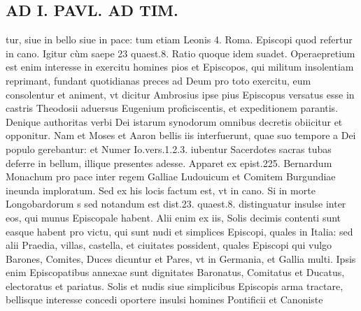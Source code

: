 \documentclass{article}
\begin{document}
\begin{pages}
\section*{AD I. PAVL. AD TIM. }
\marginpar{[ p.139 ]}\pstart tur, siue in bello siue in pace: tum etiam Leonis 4. Roma. Episcopi quod refertur in cano. Igitur cùm saepe 23 quaest.8. Ratio quoque idem suadet. Operaepretium est enim interesse in exercitu homines pios et Episcopos, qui militum insolentiam reprimant, fundant quotidianas preces ad Deum pro toto exercitu, eum consolentur et animent, vt dicitur Ambrosius ipse pius Episcopus versatus esse in castris Theodosii aduersus Eugenium proficiscentis, et expeditionem parantis. Denique authoritas verbi Dei istarum synodorum omnibus decretis obiicitur et opponitur. Nam et Moses et Aaron bellis iis interfuerunt, quae suo tempore a Dei populo gerebantur: et Numer Io.vers.1.2.3. iubentur Sacerdotes sacras tubas deferre in bellum, illique presentes adesse. Apparet ex epist.225. Bernardum Monachum pro pace inter regem Galliae Ludouicum et Comitem Burgundiae ineunda imploratum. Sed ex his locis factum est, vt in cano. Si in morte Longobardorum s sed notandum est dist.23. quaest.8. distinguatur insulse inter eos, qui munus Episcopale habent. Alii enim ex iis, Solis decimis contenti sunt easque habent pro victu, qui sunt nudi et simplices Episcopi, quales in Italia: sed alii Praedia, villas, castella, et ciuitates possident, quales Episcopi qui vulgo Barones, Comites, Duces dicuntur et Pares, vt in Germania, et Gallia multi. Ipsis enim Episcopatibus annexae sunt dignitates Baronatus, Comitatus et Ducatus, electoratus et pariatus. Solis et nudis siue simplicibus Episcopis arma tractare, bellisque interesse concedi oportere insulsi homines Pontificii et Canoniste  \pend

\end{pages}
\end{document}
